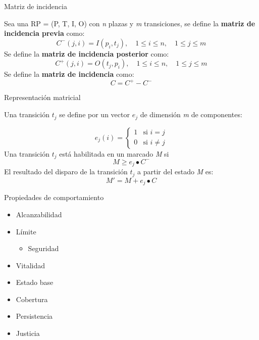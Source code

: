 \documentclass[
compress,
xcolor=table,
dvipsnames,
]{beamer}
\begin{document}

\begin{frame}{Matriz de incidencia}

    Sea una RP = (P, T, I, O) con \textit{n} plazas y \textit{m} transiciones, se define la \textbf{matriz de incidencia previa} como: 
    \begin{equation}
        C^-(j, i) = I(p_i, t_j), \quad 1 \leq i \leq n, \quad 1 \leq j \leq m  
    \end{equation}
    Se define la \textbf{matriz de incidencia posterior} como:
    \begin{equation}
        C^+(j, i) = O(t_j, p_i), \quad 1 \leq i \leq n, \quad 1 \leq j \leq m  
    \end{equation}
    Se define la \textbf{matriz de incidencia} como:
    \begin{equation}
        C = C^+ - C^-
    \end{equation}
\end{frame}


\begin{frame}{Representación matricial}

    Una transición $t_j$ se define por un vector $e_j$ de dimensión \textit{m} de componentes:

        \[ e_j(i) =
          \begin{cases}
            1       & \text{si } i = j\\
            0       & \text{si } i \neq j
          \end{cases}
        \]
    Una transición $t_j$ está habilitada en un marcado \textit{M} si
    \begin{equation}
        M \geq e_j \bullet C^-
    \end{equation}
    El resultado del disparo de la transición $t_j$ a partir del estado \textit{M} es:
    \begin{equation}
        M' = M + e_j \bullet C
    \end{equation}

\end{frame}


\begin{frame}{Propiedades de comportamiento}
    \begin{itemize}
        \item{Alcanzabilidad}
        \item{Límite}
            \begin{itemize}
                \item{Seguridad}
            \end{itemize}
        \item{Vitalidad}
        \item{Estado base}
        \item{Cobertura}
        \item{Persistencia}
        \item{Justicia}
    \end{itemize}
\end{frame}
\end{document}
